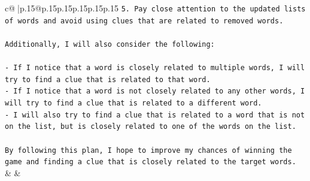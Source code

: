 \documentclass{article}
\begin{document}
{\begin{supertabular}{c@{$\;$}|p{.15\linewidth}@{}p{.15\linewidth}p{.15\linewidth}p{.15\linewidth}p{.15\linewidth}p{.15\linewidth}}
{{{\texttt{5. Pay close attention to the updated lists of words and avoid using clues that are related to removed words.} \\
\\ 
\texttt{Additionally, I will also consider the following:} \\
\\ 
\texttt{{-} If I notice that a word is closely related to multiple words, I will try to find a clue that is related to that word.} \\
\texttt{{-} If I notice that a word is not closely related to any other words, I will try to find a clue that is related to a different word.} \\
\texttt{{-} I will also try to find a clue that is related to a word that is not on the list, but is closely related to one of the words on the list.} \\
\\ 
\texttt{By following this plan, I hope to improve my chances of winning the game and finding a clue that is closely related to the target words.} \\
            }
        }
    }
    & & \\ \\

\end{supertabular}
}
\end{document}
